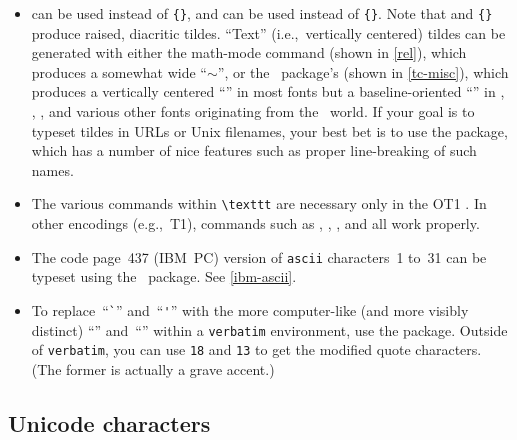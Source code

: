 \begin{itemize}
  \item \label{page:tildes}  
  can be used instead of \cmdI[\string\^{}]{\^{}}\verb|{}|, and
   can be used instead of
  \cmdI[\string\~{}]{\~{}}\verb|{}|.  Note that
   and \cmdI[\string\~{}]{\~{}}\verb|{}|
  produce raised, diacritic tildes.  ``Text''
  (i.e.,~vertically centered)
  tildes can be generated with either the math-mode 
  command (shown in \vref{rel}), which produces a somewhat wide
  ``$\sim$'', or the \TC\ package's  (shown in
  \vref{tc-misc}), which produces a vertically centered
  ``{\selectfont\texttildelow}'' in most fonts but a
  baseline-oriented ``\texttildelow'' in ,
  \TX, \PX, and various other fonts originating from the
  \tex\ world.  If your goal is to typeset tildes in URLs or Unix
  filenames, your best bet is to use the  package,
  which has a number of nice features such as proper line-breaking
  of such names.

  \item The various \cmd{\char} commands within \verb|\texttt| are
  necessary only in the OT1 \fntenc[OT1].  In other encodings
  (e.g.,~T1), commands such as \cmdIp{\{},
  \cmdIp{\}}, \docAuxCommand{_}, and  all work properly.

  \item The code page~437 (IBM~PC)
  version of \texttt{ascii} characters~1 to~31 can be typeset
  using the \ASCII\ package.
\ifASCII
  See \vref{ibm-ascii}.
\fi

  \item To replace~``\verb|`|'' and~``\verb|'|'' with the more
  computer-like (and more visibly distinct) ``\texttt{}''
  and~``\texttt{}'' within a \texttt{verbatim} environment,
  use the  package.  Outside of \texttt{verbatim},
  you can use \cmd{\char}\texttt{18} and \cmd{\char}\texttt{13} to
  get the modified quote characters.  (The former is actually a
  grave accent.)
\end{itemize}





\subsection{Unicode characters}
\label{unicode-chars}

